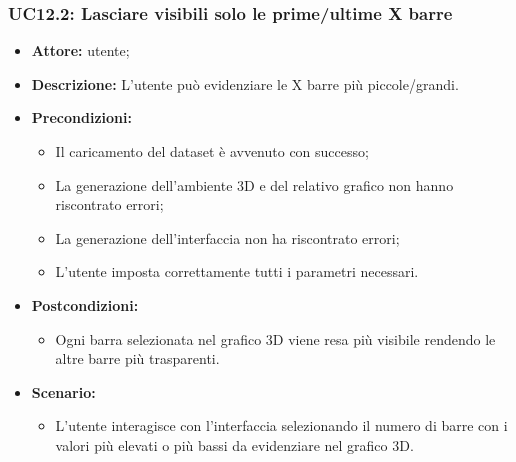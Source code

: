 \subsubsection{UC12.2: Lasciare visibili solo le prime/ultime X barre}
\begin{itemize}    
    \item \textbf{Attore:} utente;
    \item \textbf{Descrizione:} L'utente può evidenziare le X barre più piccole/grandi.
    \item \textbf{Precondizioni:}    
        \begin{itemize}
            \item Il caricamento del dataset è avvenuto con successo;
            \item La generazione dell'ambiente 3D e del relativo grafico non hanno riscontrato errori;
            \item La generazione dell'interfaccia non ha riscontrato errori;
            \item L'utente imposta correttamente tutti i parametri necessari.
        \end{itemize}    
    \item \textbf{Postcondizioni:}
        \begin{itemize}
            \item Ogni barra selezionata nel grafico 3D viene resa più visibile rendendo le altre barre più trasparenti.
        \end{itemize}    
    \item \textbf{Scenario:} 
        \begin{itemize}
            \item L'utente interagisce con l'interfaccia selezionando il numero di barre con i valori più elevati o più bassi da evidenziare nel grafico 3D.
        \end{itemize}
\end{itemize}
